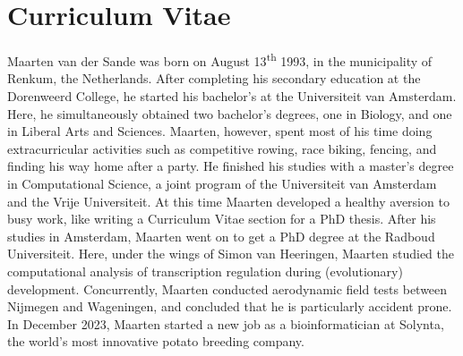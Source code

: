 \section{Curriculum Vitae}

Maarten van der Sande was born on August 13\textsuperscript{th} 1993, in the municipality of Renkum, the Netherlands. After completing his secondary education at the Dorenweerd College, he started his bachelor's at the Universiteit van Amsterdam. Here, he simultaneously obtained two bachelor's degrees, one in Biology, and one in Liberal Arts and Sciences. Maarten, however, spent most of his time doing extracurricular activities such as competitive rowing, race biking, fencing, and finding his way home after a party. He finished his studies with a master's degree in Computational Science, a joint program of the Universiteit van Amsterdam and the Vrije Universiteit. At this time Maarten developed a healthy aversion to busy work, like writing a Curriculum Vitae section for a PhD thesis. After his studies in Amsterdam, Maarten went on to get a PhD degree at the Radboud Universiteit. Here, under the wings of Simon van Heeringen, Maarten studied the computational analysis of transcription regulation during (evolutionary) development. Concurrently, Maarten conducted aerodynamic field tests between Nijmegen and Wageningen, and concluded that he is particularly accident prone. In December 2023, Maarten started a new job as a bioinformatician at Solynta, the world's most innovative potato breeding company.

\newpage
